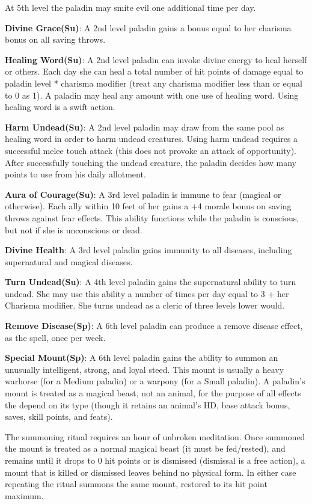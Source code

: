 At 5th level the paladin may smite evil one additional time per day.

\textbf{Divine Grace(Su)}: A 2nd level paladin gains a bonus equal to her charisma bonus on all saving throws.

\textbf{Healing Word(Su)}: A 2nd level paladin can invoke divine energy to heal herself or others. Each day she can heal a total number of hit points of damage equal to paladin level * charisma modifier (treat any charisma modifier less than or equal to 0 as 1). A paladin may heal any amount with one use of healing word. Using healing word is a swift action.

\textbf{Harm Undead(Su)}: A 2nd level paladin may draw from the same pool as healing word in order to harm undead creatures. Using harm undead requires a successful melee touch attack (this does not provoke an attack of opportunity). After successfully touching the undead creature, the paladin decides how many points to use from his daily allotment. 

\textbf{Aura of Courage(Su)}: A 3rd level paladin is immune to fear (magical or otherwise). Each ally within 10 feet of her gains a +4 morale bonus on saving throws against fear effects. This ability functions while the paladin is conscious, but not if she is unconscious or dead.

\textbf{Divine Health}: A 3rd level paladin gains immunity to all diseases, including supernatural and magical diseases.

\textbf{Turn Undead(Su)}: A 4th level paladin gains the supernatural ability to turn undead. She may use this ability a number of times per day equal to 3 + her Charisma modifier. She turns undead as a cleric of three levels lower would.

\textbf{Remove Disease(Sp)}: A 6th level paladin can produce a remove disease effect, as the spell, once per week.

\textbf{Special Mount(Sp)}: A 6th level paladin gains the ability to summon an unusually intelligent, strong, and loyal steed. This mount is usually a heavy warhorse (for a Medium paladin) or a warpony (for a Small paladin). A paladin's mount is treated as a magical beast, not an animal, for the purpose of all effects the depend on its type (though it retains an animal's HD, base attack bonus, saves, skill points, and feats).

The summoning ritual requires an hour of unbroken meditation. Once summoned the mount is treated as a normal magical beast (it must be fed/rested), and remains until it drops to 0 hit points or is dismissed (dismissal is a free action), a mount that is killed or dismissed leaves behind no physical form. In either case repeating the ritual summons the same mount, restored to its hit point maximum.

